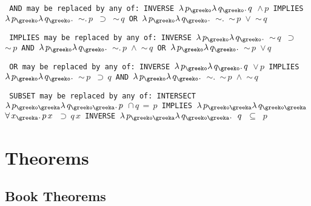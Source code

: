 \begin{description} 
\item[AND]  \texttt{
AND may be replaced by any of:
INVERSE   $ \lambda \,p_{\greeko} \lambda \,q_{\greeko} . \,q $ $\land \,p$
IMPLIES   $ \lambda \,p_{\greeko} \lambda \,q_{\greeko} . $ $\sim . \,p $ $\supset $ $\sim \,q$
OR        $ \lambda \,p_{\greeko} \lambda \,q_{\greeko} . $ $\sim . $ $\sim \,p $ $\lor $ $\sim \,q$}

\item[IMPLIES]  \texttt{
IMPLIES may be replaced by any of:
INVERSE   $ \lambda \,p_{\greeko} \lambda \,q_{\greeko} . $ $\sim \,q $ $\supset $ $\sim \,p$
AND       $ \lambda \,p_{\greeko} \lambda \,q_{\greeko} . $ $\sim . \,p $ $\land $ $\sim \,q$
OR        $ \lambda \,p_{\greeko} \lambda \,q_{\greeko} . $ $\sim \,p $ $\lor \,q$}

\item[OR]  \texttt{
OR may be replaced by any of:
INVERSE   $ \lambda \,p_{\greeko} \lambda \,q_{\greeko} . \,q $ $\lor \,p$
IMPLIES   $ \lambda \,p_{\greeko} \lambda \,q_{\greeko} . $ $\sim \,p $ $\supset \,q$
AND       $ \lambda \,p_{\greeko} \lambda \,q_{\greeko} . $ $\sim . $ $\sim \,p $ $\land $ $\sim \,q$}

\item[SUBSET]  \texttt{
SUBSET may be replaced by any of:
INTERSECT $ \lambda \,p_{\greeko\greeka} \lambda \,q_{\greeko\greeka} . \,p $ $\cap \,q \,= \,p$
IMPLIES   $ \lambda \,p_{\greeko\greeka} \lambda \,q_{\greeko\greeka} $ $\forall \,x_{\greeka} . \,p \,x $ $\supset \,q \,x$
INVERSE   $ \lambda \,p_{\greeko\greeka} \lambda \,q_{\greeko\greeka} . \,~ \,q $ $\subseteq \,~ \,p$}

\item
\end{description}
\chapter{Theorems}

\section{Book Theorems}

